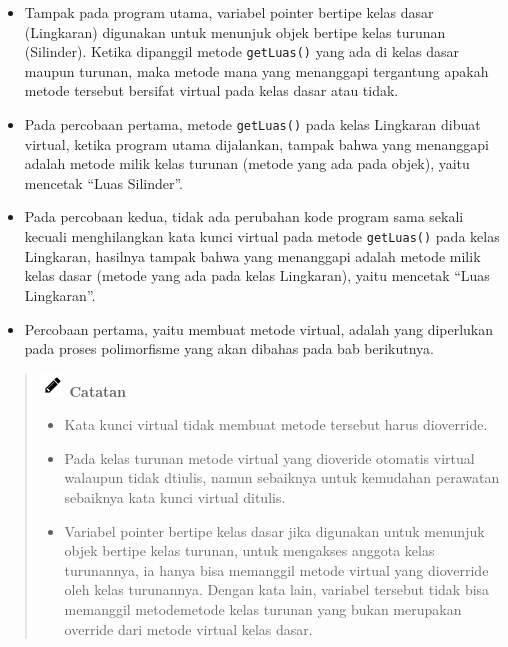 \begin{itemize}

\item
  Tampak pada program utama, variabel pointer bertipe kelas dasar
  (Lingkaran) digunakan untuk menunjuk objek bertipe kelas turunan
  (Silinder). Ketika dipanggil metode \texttt{getLuas()} yang ada di
  kelas dasar maupun turunan, maka metode mana yang menanggapi
  tergantung apakah metode tersebut bersifat virtual pada kelas dasar
  atau tidak.
\item
  Pada percobaan pertama, metode \texttt{getLuas()} pada kelas Lingkaran
  dibuat virtual, ketika program utama dijalankan, tampak bahwa yang
  menanggapi adalah metode milik kelas turunan (metode yang ada pada
  objek), yaitu mencetak ``Luas Silinder''.
\item
  Pada percobaan kedua, tidak ada perubahan kode program sama sekali
  kecuali menghilangkan kata kunci virtual pada metode
  \texttt{getLuas()} pada kelas Lingkaran, hasilnya tampak bahwa yang
  menanggapi adalah metode milik kelas dasar (metode yang ada pada kelas
  Lingkaran), yaitu mencetak ``Luas Lingkaran''.
\item
  Percobaan pertama, yaitu membuat metode virtual, adalah yang
  diperlukan pada proses polimorfisme yang akan dibahas pada bab
  berikutnya.
\end{itemize}
\begin{quotation}
\includegraphics{../manuscript/images/pencil}	\textbf{Catatan} 
	\begin{itemize}
		\item Kata
		kunci virtual tidak membuat metode tersebut harus dioverride.
		\item Pada kelas turunan metode virtual yang dioveride
		otomatis virtual walaupun tidak dtiulis, namun sebaiknya untuk kemudahan
		perawatan sebaiknya kata kunci virtual ditulis.
		\item Variabel pointer bertipe kelas dasar jika digunakan untuk menunjuk objek
		bertipe kelas turunan, untuk mengakses anggota kelas turunannya, ia
		hanya bisa memanggil metode virtual yang dioverride oleh kelas
		turunannya. Dengan kata lain, variabel tersebut tidak bisa memanggil
		metodemetode kelas turunan yang bukan merupakan override dari metode
		virtual kelas dasar.
	\end{itemize}
\end{quotation}
 

